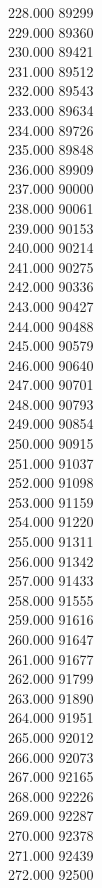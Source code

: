 { 228.000	89299 \\
 229.000	89360 \\
 230.000	89421 \\
 231.000	89512 \\
 232.000	89543 \\
 233.000	89634 \\
 234.000	89726 \\
 235.000	89848 \\
 236.000	89909 \\
 237.000	90000 \\
 238.000	90061 \\
 239.000	90153 \\
 240.000	90214 \\
 241.000	90275 \\
 242.000	90336 \\
 243.000	90427 \\
 244.000	90488 \\
 245.000	90579 \\
 246.000	90640 \\
 247.000	90701 \\
 248.000	90793 \\
 249.000	90854 \\
 250.000	90915 \\
 251.000	91037 \\
 252.000	91098 \\
 253.000	91159 \\
 254.000	91220 \\
 255.000	91311 \\
 256.000	91342 \\
 257.000	91433 \\
 258.000	91555 \\
 259.000	91616 \\
 260.000	91647 \\
 261.000	91677 \\
 262.000	91799 \\
 263.000	91890 \\
 264.000	91951 \\
 265.000	92012 \\
 266.000	92073 \\
 267.000	92165 \\
 268.000	92226 \\
 269.000	92287 \\
 270.000	92378 \\
 271.000	92439 \\
 272.000	92500 \\
}
